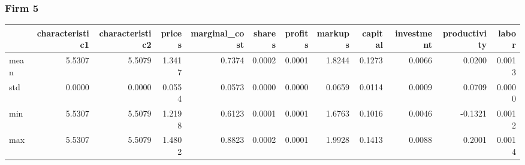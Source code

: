  \subsubsection*{Firm 5}
\begin{tabular}{lrrrrrrrrrrr}
\toprule
{} &  characteristic1 &  characteristic2 &  prices &  marginal\_cost &  shares &  profits &  markups &  capital &  investment &  productivity &  labor \\
\midrule
mean &           5.5307 &           5.5079 &  1.3417 &         0.7374 &  0.0002 &   0.0001 &   1.8244 &   0.1273 &      0.0066 &        0.0200 & 0.0013 \\
std  &           0.0000 &           0.0000 &  0.0554 &         0.0573 &  0.0000 &   0.0000 &   0.0659 &   0.0114 &      0.0009 &        0.0709 & 0.0000 \\
min  &           5.5307 &           5.5079 &  1.2198 &         0.6123 &  0.0001 &   0.0001 &   1.6763 &   0.1016 &      0.0046 &       -0.1321 & 0.0012 \\
max  &           5.5307 &           5.5079 &  1.4802 &         0.8823 &  0.0002 &   0.0001 &   1.9928 &   0.1413 &      0.0088 &        0.2001 & 0.0014 \\
\bottomrule
\end{tabular}


